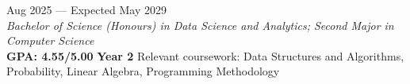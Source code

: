  \hfill Aug 2025 --- Expected May 2029\\
\textit{Bachelor of Science (Honours) in Data Science and Analytics; Second Major in Computer Science}\\
\textbf{GPA: 4.55/5.00} \quad \textbf{Year 2} \quad Relevant coursework: Data Structures and Algorithms, Probability, Linear Algebra, Programming Methodology
